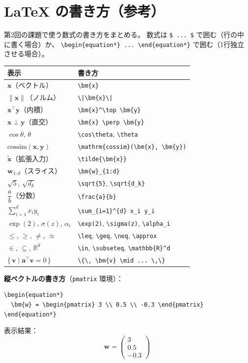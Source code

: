 \documentclass[a4paper,dvipdfmx]{jsarticle}
\newcommand{\学籍番号}{0000000}
\newcommand{\氏名}{氏名を書く}
\newcommand{\提出日}{2026年10月8日}
\begin{document}
\clearpage
\section*{LaTeX の書き方（参考）}

第2回の課題で使う数式の書き方をまとめる。
数式は \verb|$ ... $| で囲む（行の中に書く場合）か、
\verb|\begin{equation*} ... \end{equation*}| で囲む（1行独立させる場合）。

\begin{center}
\small
\begin{tabular}{l|l}
\hline
表示 & 書き方 \\
\hline\hline
$\bm{x}$（ベクトル） & \verb|\bm{x}| \\
$\|\bm{x}\|$（ノルム） & \verb+\|\bm{x}\|+ \\
$\bm{x}^\top \bm{y}$（内積） & \verb|\bm{x}^\top \bm{y}| \\
$\bm{x} \perp \bm{y}$（直交） & \verb|\bm{x} \perp \bm{y}| \\
$\cos\theta$, $\theta$ & \verb|\cos\theta|, \verb|\theta| \\
$\mathrm{cossim}(\bm{x}, \bm{y})$ & \verb|\mathrm{cossim}(\bm{x}, \bm{y})| \\
$\tilde{\bm{x}}$（拡張入力） & \verb|\tilde{\bm{x}}| \\
$\bm{w}_{1:d}$（スライス） & \verb|\bm{w}_{1:d}| \\
$\sqrt{5}$, $\sqrt{d_k}$ & \verb|\sqrt{5}|, \verb|\sqrt{d_k}| \\
$\dfrac{a}{b}$（分数） & \verb|\frac{a}{b}| \\
$\displaystyle\sum_{i=1}^{d} x_i y_i$ & \verb|\sum_{i=1}^{d} x_i y_i| \\
$\exp(2)$, $\sigma(z)$, $\alpha_i$ & \verb|\exp(2)|, \verb|\sigma(z)|, \verb|\alpha_i| \\
$\leq$, $\geq$, $\neq$, $\approx$ & \verb|\leq|, \verb|\geq|, \verb|\neq|, \verb|\approx| \\
$\in$, $\subseteq$, $\mathbb{R}^d$ & \verb|\in|, \verb|\subseteq|, \verb|\mathbb{R}^d| \\
$\{\, \bm{v} \mid \bm{a}^\top\bm{v} = 0 \,\}$ & \verb+\{\, \bm{v} \mid ... \,\}+ \\
\hline
\end{tabular}
\end{center}

\noindent
\textbf{縦ベクトルの書き方}（\verb|pmatrix| 環境）：
\begin{verbatim}
\begin{equation*}
  \bm{w} = \begin{pmatrix} 3 \\ 0.5 \\ -0.3 \end{pmatrix}
\end{equation*}
\end{verbatim}
表示結果：
\begin{equation*}
  \bm{w} = \begin{pmatrix} 3 \\ 0.5 \\ -0.3 \end{pmatrix}
\end{equation*}
\end{document}
